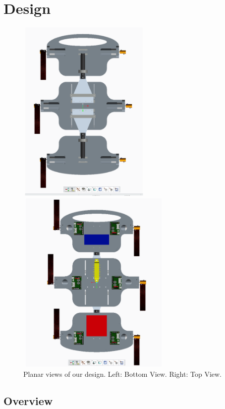 \documentclass[11pt]{article}
\begin{document}
\section{Design}

\begin{figure}[ht]
\begin{minipage}[b]{0.45\linewidth}
\centering
\includegraphics[width=6.5cm, height=9cm]{Xjus2.png}
\end{minipage}
\hspace{0.5cm}
\begin{minipage}[b]{0.45\linewidth}
\centering
\includegraphics[width=7.5cm,height=9cm]{Xjus3.png}
\end{minipage}
\caption{Planar views of our design. Left: Bottom View. Right: Top View.}
\end{figure}

\subsection{Overview}
\end{document}
